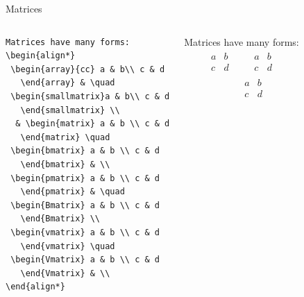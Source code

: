 \documentclass[aspectratio=1610]{beamer}
\begin{document}
\begin{frame}[fragile]{Matrices}
  \begin{columns}[T]
      \begin{lstlisting}
Matrices have many forms:
\begin{align*}
 \begin{array}{cc} a & b\\ c & d
   \end{array} & \quad
 \begin{smallmatrix}a & b\\ c & d
   \end{smallmatrix} \\
  & \begin{matrix} a & b \\ c & d
   \end{matrix} \quad
 \begin{bmatrix} a & b \\ c & d
   \end{bmatrix} & \\
 \begin{pmatrix} a & b \\ c & d
   \end{pmatrix} & \quad
 \begin{Bmatrix} a & b \\ c & d
   \end{Bmatrix} \\
 \begin{vmatrix} a & b \\ c & d
   \end{vmatrix} \quad
 \begin{Vmatrix} a & b \\ c & d
   \end{Vmatrix} & \\
\end{align*}
      \end{lstlisting}
Matrices have many forms:
\begin{align*}
 \begin{array}{cc} a & b\\ c & d
   \end{array} & \quad
 \begin{smallmatrix}a & b\\ c & d
   \end{smallmatrix} \\
  & \begin{matrix} a & b \\ c & d

\end{matrix}
\end{align*}
\end{columns}
\end{frame}
\end{document}
